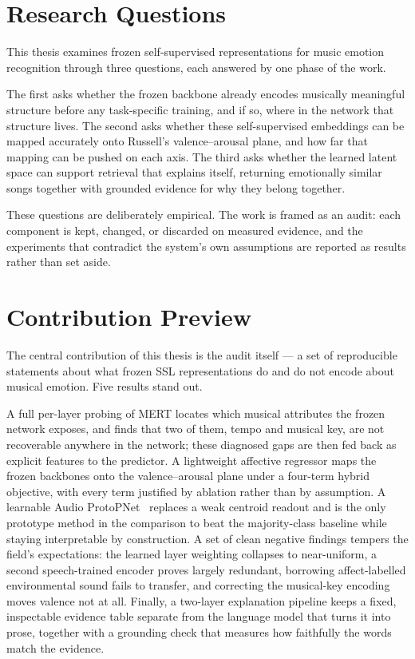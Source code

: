 \documentclass[12pt]{report}
\begin{document}
\section{Research Questions}

This thesis examines frozen self-supervised representations for music emotion recognition through three questions, each answered by one phase of the work.

The first asks whether the frozen backbone already encodes musically meaningful structure before any task-specific training, and if so, where in the network that structure lives. The second asks whether these self-supervised embeddings can be mapped accurately onto Russell's valence--arousal plane, and how far that mapping can be pushed on each axis. The third asks whether the learned latent space can support retrieval that explains itself, returning emotionally similar songs together with grounded evidence for why they belong together.

These questions are deliberately empirical. The work is framed as an audit: each component is kept, changed, or discarded on measured evidence, and the experiments that contradict the system's own assumptions are reported as results rather than set aside.

\section{Contribution Preview}

The central contribution of this thesis is the audit itself --- a set of reproducible statements about what frozen SSL representations do and do not encode about musical emotion. Five results stand out.

A full per-layer probing of MERT locates which musical attributes the frozen network exposes, and finds that two of them, tempo and musical key, are not recoverable anywhere in the network; these diagnosed gaps are then fed back as explicit features to the predictor. A lightweight affective regressor maps the frozen backbones onto the valence--arousal plane under a four-term hybrid objective, with every term justified by ablation rather than by assumption. A learnable Audio ProtoPNet~\cite{chen_protopnet_2019} replaces a weak centroid readout and is the only prototype method in the comparison to beat the majority-class baseline while staying interpretable by construction. A set of clean negative findings tempers the field's expectations: the learned layer weighting collapses to near-uniform, a second speech-trained encoder proves largely redundant, borrowing affect-labelled environmental sound fails to transfer, and correcting the musical-key encoding moves valence not at all. Finally, a two-layer explanation pipeline keeps a fixed, inspectable evidence table separate from the language model that turns it into prose, together with a grounding check that measures how faithfully the words match the evidence.
\end{document}

